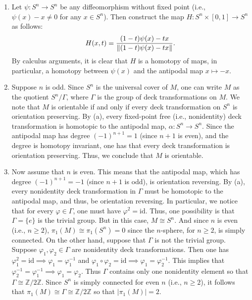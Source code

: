 \documentclass{article}
\begin{document}
	\begin{enumerate}[itemsep =-2pt,label = (\alph{*})]
		\item Let $\psi: S^n \to S^n$ be any diffeomorphism without fixed point (i.e., $\psi(x) - x \neq 0$ for any $x \in S^n$). Then construct the map $H: S^n \times [0,1] \to S^n$ as follows: 
		\begin{equation*}
			H(x,t) = \frac{(1 - t)\psi(x) - tx}{\left\Vert (1 - t)\psi(x) - tx \right\Vert}. 
		\end{equation*}
		By calculus arguments, it is clear that $H$ is a homotopy of maps, in particular, a homotopy between $\psi(x)$ and the antipodal map $x \mapsto -x$. 
		\item Suppose $n$ is odd. Since $S^n$ is the universal cover of $M$, one can write $M$ as the quotient $S^n/\Gamma$, where $\Gamma$ is the group of deck transformations on $M$. We note that $M$ is orientable if and only if every deck transformation on $S^n$ is orientation preserving. By (a), every fixed-point free (i.e., nonidentity) deck transformation is homotopic to the antipodal map, $\alpha: S^n \to S^n$. Since the antipodal map has degree $(-1)^{n + 1} = 1$ (since $n + 1$ is even), and the degree is homotopy invariant, one has that every deck transformation is orientation preserving. Thus, we conclude that $M$ is orientable. 
		\item Now assume that $n$ is even. This means that the antipodal map, which has degree $(-1)^{n + 1} = -1$ (since $n + 1$ is odd), is orientation reversing. By (a), every nonidentity deck transformation in $\Gamma$ must be homotopic to the antipodal map, and thus, be orientation reversing. In particular, we notice that for every $\varphi \in \Gamma$, one must have $\varphi^2 = \text{id}$. Thus, one possibility is that $\Gamma = \{e\}$ is the trivial group. But in this case, $M \cong S^{n}$. And since $n$ is even (i.e., $n \geq 2$), $\pi_{1}(M) \cong \pi_{1}(S^{n}) = 0$ since the $n$-sphere, for $n\geq 2$, is simply connected. On the other hand, suppose that $\Gamma$ is not the trivial group. Suppose $\varphi_{1}, \varphi_{2} \in \Gamma$ are nonidentity deck transformations. Then one has $\varphi_1^2 = \text{id} \implies \varphi_{1} = \varphi_{1}^{-1}$ and $\varphi_{1}\circ \varphi_{2} = \text{id} \implies \varphi_{1} = \varphi_{2}^{-1}$. This implies that $\varphi_{2}^{-1} = \varphi_{1}^{-1} \implies \varphi_{1} = \varphi_{2}$. Thus $\Gamma$ contains only one nonidentity element so that $\Gamma \cong \mathbb{Z}/2\mathbb{Z}$. Since $S^{n}$ is simply connected for even $n$ (i.e., $n \geq 2$), it follows that $\pi_{1}(M) \cong \Gamma \cong \mathbb{Z}/2\mathbb{Z}$ so that $|\pi_{1}(M)| = 2$. 
	\end{enumerate}
	
\end{document}

